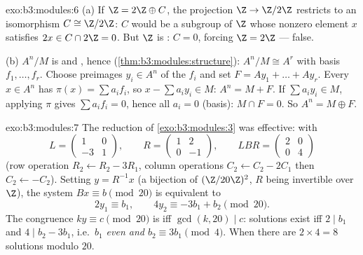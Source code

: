 \begin{solution}{exo:b3:modules:6}
(a) If $\Z = 2\Z \oplus C$, the projection $\Z \to \Z/2\Z$
restricts to an isomorphism $C \cong \Z/2\Z$: $C$ would be a
subgroup of $\Z$ whose nonzero element $x$ satisfies $2x \in C
\cap 2\Z = 0$. But $\Z$ is : $C = 0$, forcing $\Z =
2\Z$ --- false.

(b) $A^n/M$ is  and , hence 
(\cref{thm:b3:modules:structure}): $A^n/M \cong A^r$ with basis
$f_1, \dots, f_r$. Choose preimages $y_i \in A^n$ of the $f_i$
and set $F = Ay_1 + \dots + Ay_r$. Every $x \in A^n$ has $\pi(x)
= \sum a_if_i$, so $x - \sum a_iy_i \in M$: $A^n = M + F$. If
$\sum a_iy_i \in M$, applying $\pi$ gives $\sum a_if_i = 0$,
hence all $a_i = 0$ (basis): $M \cap F = 0$. So $A^n = M \oplus
F$.
\end{solution}

\begin{solution}{exo:b3:modules:7}
The reduction of \cref{exo:b3:modules:3} was effective: with
\[
L = \begin{pmatrix} 1 & 0\\ -3 & 1\end{pmatrix},
\qquad
R = \begin{pmatrix} 1 & 2\\ 0 & -1 \end{pmatrix},
\qquad
LBR = \begin{pmatrix} 2 & 0\\ 0 & 4\end{pmatrix}
\]
(row operation $R_2 \leftarrow R_2 - 3R_1$, column operations
$C_2 \leftarrow C_2 - 2C_1$ then $C_2 \leftarrow -C_2$). Setting
$y = R^{-1}x$ (a bijection of $(\Z/20\Z)^2$, $R$ being
invertible over $\Z$), the system $Bx \equiv b \pmod{20}$ is
equivalent to
\[
2y_1 \equiv b_1, \qquad 4y_2 \equiv -3b_1 + b_2 \pmod{20}.
\]
The congruence $ky \equiv c \pmod{20}$ is  iff
$\gcd(k, 20) \mid c$: solutions exist iff $2 \mid b_1$ and $4
\mid b_2 - 3b_1$, i.e.\ \emph{$b_1$ even and $b_2 \equiv 3b_1
\pmod 4$}. When  there are $2 \times 4 = 8$ solutions
modulo $20$.
\end{solution}

